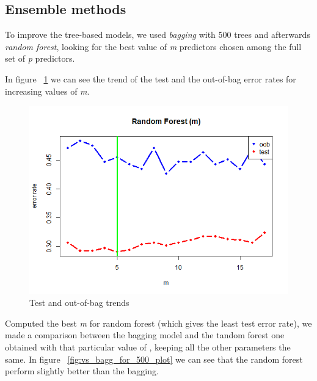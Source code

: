 \subsection{Ensemble methods}

To improve the tree-based models, we used \textit{bagging} with 500 trees and afterwards \textit{random forest}, looking for the best value of \textit{m} predictors chosen among the full set of \textit{p} predictors. 

In figure \Fig~\ref{fig:m_best_for_500_plot} we can see the trend of the test and the out-of-bag error rates for increasing values of \textit{m}.

\begin{figure}[h]
	\centering
	\includegraphics[width=0.5\linewidth]{ImageFiles/Classification/m_best_for_500_plot}
	\caption{Test and out-of-bag trends}
	\label{fig:m_best_for_500_plot}
\end{figure}

Computed the best \textit{m} for random forest (which gives the least test error rate), we made a comparison between the bagging model and the tandom forest one obtained with that particular value of , keeping all the other parameters the same.
In figure \Fig~\ref{fig:vs_bagg_for_500_plot} we can see that the random forest perform slightly better than the bagging.

